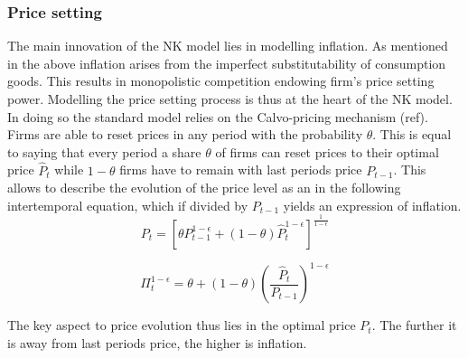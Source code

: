 \documentclass[12pt,a4paper,english]{article} %
\begin{document}
	\subsubsection{Price setting}
	The main innovation of the NK model lies in modelling inflation. As mentioned in the above inflation arises from the imperfect substitutability of consumption goods. This results in monopolistic competition endowing firm's price setting power. Modelling the price setting process is thus at the heart of the NK model. In doing so the standard model relies on the Calvo-pricing mechanism (ref). Firms are able to reset prices in any period with the probability $\theta$. This is equal to saying that every period a share $\theta$ of firms can reset prices to their optimal price $\hat{P}_t$ while $1-\theta$ firms have to remain with last periods price $P_{t-1}$. This allows to describe the evolution of the price level as an in the following intertemporal equation, which if divided by $P_{t-1}$ yields an expression of inflation.
	\begin{equation}
		P_t = 
		\left[
		\theta P_{t-1}^{1 - \epsilon} + (1 - \theta) \hat{P}_t^{1 - \epsilon}
		\right]^{\frac{1}{1 - \epsilon}}
	\end{equation}

	\begin{equation} \label{eq: inlfation}
		\Pi_t^{1-\epsilon} = \theta + (1 - \theta) \left(\frac{\hat{P}_t}{P_{t-1}} \right)^{1-\epsilon}
	\end{equation}

	The key aspect to price evolution thus lies in the optimal price $\hat{P_t}$. The further it is away from last periods price, the higher is inflation. \\
	
\end{document}
